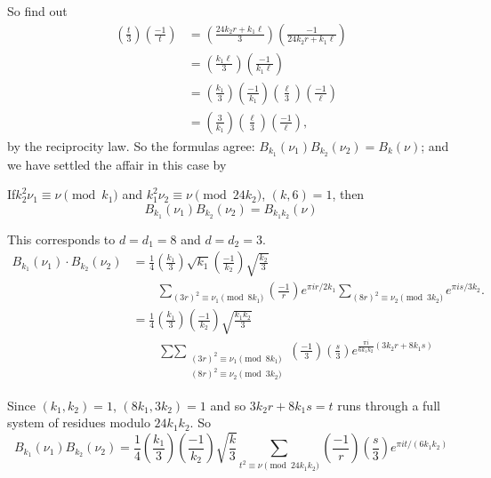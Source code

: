 So find out
\begin{align*}
  \left( \frac{t}{3}\right) \left( \frac{-1}{t}\right) & = \left(
  \frac{24k_2 r+ k_1\ell}{3}\right) \left( \frac{-1}{24 k_2 r + k_1
    \ell}\right)\\
  & = \left( \frac{k_1\ell}{3}\right) \left(
  \frac{-1}{k_1\ell}\right)\\
  & = \left( \frac{k_1}{3}\right)\left( \frac{-1}{k_1}\right) \left(
  \frac{\ell}{3}\right) \left( \frac{-1}{\ell}\right)\\
  & = \left( \frac{3}{k_1}\right) \left( \frac{\ell}{3}\right) \left(
  \frac{-1}{\ell}\right), 
\end{align*}
by the reciprocity law. So the formulas agree: $B_{k_1} (\nu_1)
B_{k_2} (\nu_2)= B_k (\nu)$; and we have settled the affair in this
case by

\setcounter{thm}{0}
\begin{thm}\label{part3:lec26:thm1}
  If\pageoriginale $k_2^2 \nu_1 \equiv \nu \pmod{k_1}$ and $k_1^2 \nu_2 \equiv
  \nu \pmod{24 k_2}$, $(k, 6)=1$, then 
  $$
  B_{k_1} (\nu_1) B_{k_2}(\nu_2)= B_{k_1 k_2}(\nu)
  $$
\end{thm}

\begin{case}\label{part3:lec26:case2}
  This corresponds to $d=d_1=8$ and $d= d_2=3$.
  \begin{align*}
    B_{k_1}(\nu_1) \cdot B_{k_2}(\nu_2) & = \frac{1}{4} \left(
    \frac{k_1}{3}\right) \sqrt{k_1} \left( \frac{-1}{k_2}\right)
    \sqrt{\frac{k_2}{3}}\\
    & \qquad \sum_{(3r)^2 \equiv \nu_1 \pmod{8k_1}} \left( \frac{-1}{r}\right)
    e^{\pi i r/2k_1} \sum_{(8r)^2 \equiv \nu_2 \pmod{3k_2}} e^{\pi i s
    /3k_2}.\\
    & = \frac{1}{4} \left( \frac{k_1}{3}\right) \left(
    \frac{-1}{k_2}\right) \sqrt{\frac{k_1 k_2}{3}}\\
    & \qquad \mathop{\sum\sum}_{\substack{(3r)^2 \equiv \nu_1
      \pmod{8k_1}\\ (8r)^2 \equiv \nu_2 \pmod{3k_2}}} \left(
    \frac{-1}{3}\right) \left( \frac{s}{3}\right) e^{\frac{\pi i}{6
        k_1 k_2}(3 k_2 r + 8 k_1 s)}
  \end{align*}
\end{case}

Since $(k_1, k_2)=1$, $(8k_1, 3k_2)=1$ and so $3k_2 r + 8k_1 s=t$ runs
through a full system of residues modulo $24k_1 k_2$. So
$$
B_{k_1} (\nu_1) B_{k_2} (\nu_2) = \frac{1}{4} \left(
\frac{k_1}{3}\right)\left( \frac{-1}{k_2}\right)  \sqrt{\frac{k}{3}}
\sum_{t^2 \equiv \nu \pmod{24 k_1 k_2}} \left( \frac{-1}{r}\right)
\left( \frac{s}{3}\right)  e^{\pi i t/(6k_1 k_2)}
$$

